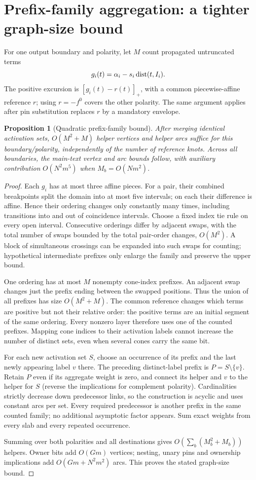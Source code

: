 \documentclass[10pt,letterpaper]{article}
\newtheorem{proposition}[theorem]{Proposition}
\begin{document}
\section{Prefix-family aggregation: a tighter graph-size bound}
For one output boundary and polarity, let $M$ count propagated untruncated terms
\[
 g_i(t)=\alpha_i-s_i\operatorname{dist}(t,I_i).
\]
The positive excursion is $[g_i(t)-r(t)]_+$, with a common piecewise-affine reference $r$; using $r=-f^0$ covers the other polarity. The same argument applies after pin substitution replaces $r$ by a mandatory envelope.

\begin{proposition}[Quadratic prefix-family bound]
After merging identical activation sets, $O(M^2+M)$ helper vertices and helper arcs suffice for this boundary/polarity, independently of the number of reference knots. Across all boundaries, the main-text vertex and arc bounds follow, with auxiliary contribution $O(N^2m^5)$ when $M_b=O(Nm^2)$.
\end{proposition}
\begin{proof}
Each $g_i$ has at most three affine pieces. For a pair, their combined breakpoints split the domain into at most five intervals; on each their difference is affine. Hence their ordering changes only constantly many times, including transitions into and out of coincidence intervals. Choose a fixed index tie rule on every open interval. Consecutive orderings differ by adjacent swaps, with the total number of swaps bounded by the total pair-order changes, $O(M^2)$. A block of simultaneous crossings can be expanded into such swaps for counting; hypothetical intermediate prefixes only enlarge the family and preserve the upper bound.

One ordering has at most $M$ nonempty cone-index prefixes. An adjacent swap changes just the prefix ending between the swapped positions. Thus the union of all prefixes has size $O(M^2+M)$. The common reference changes which terms are positive but not their relative order: the positive terms are an initial segment of the same ordering. Every nonzero layer therefore uses one of the counted prefixes. Mapping cone indices to their activation labels cannot increase the number of distinct sets, even when several cones carry the same bit.

For each new activation set $S$, choose an occurrence of its prefix and the last newly appearing label $v$ there. The preceding distinct-label prefix is $P=S\setminus\{v\}$. Retain $P$ even if its aggregate weight is zero, and connect its helper and $v$ to the helper for $S$ (reverse the implications for complement polarity). Cardinalities strictly decrease down predecessor links, so the construction is acyclic and uses constant arcs per set. Every required predecessor is another prefix in the same counted family; no additional asymptotic factor appears. Sum exact weights from every slab and every repeated occurrence.

Summing over both polarities and all destinations gives $O(\sum_b(M_b^2+M_b))$ helpers. Owner bits add $O(Gm)$ vertices; nesting, unary pins and ownership implications add $O(Gm+N^2m^2)$ arcs. This proves the stated graph-size bound.
\end{proof}
\end{document}
